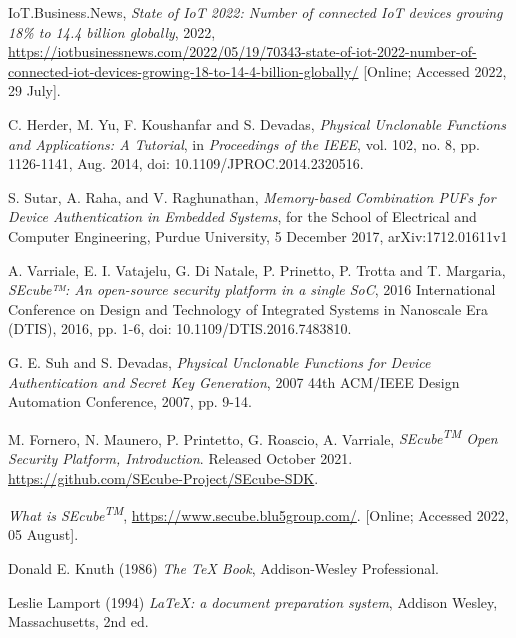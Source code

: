 \begin{thebibliography}{9}

IoT.Business.News, \emph{State of IoT 2022: Number of connected IoT devices growing 18\% to 14.4 billion globally},  2022, \url{https://iotbusinessnews.com/2022/05/19/70343-state-of-iot-2022-number-of-connected-iot-devices-growing-18-to-14-4-billion-globally/} [Online; Accessed 2022, 29 July].

C. Herder, M. Yu, F. Koushanfar and S. Devadas, \emph{Physical Unclonable Functions and Applications: A Tutorial}, in \emph{Proceedings of the IEEE}, vol. 102, no. 8, pp. 1126-1141, Aug. 2014, doi: 10.1109/JPROC.2014.2320516.

S. Sutar, A. Raha, and V. Raghunathan, \emph{Memory-based Combination PUFs for Device Authentication in Embedded Systems}, for the School of Electrical and Computer Engineering, Purdue University, 5 December 2017, arXiv:1712.01611v1

A. Varriale, E. I. Vatajelu, G. Di Natale, P. Prinetto, P. Trotta and T. Margaria, \emph{SEcube™: An open-source security platform in a single SoC}, 2016 International Conference on Design and Technology of Integrated Systems in Nanoscale Era (DTIS), 2016, pp. 1-6, doi: 10.1109/DTIS.2016.7483810.

G. E. Suh and S. Devadas, \emph{Physical Unclonable Functions for Device Authentication and Secret Key Generation}, 2007 44th ACM/IEEE Design Automation Conference, 2007, pp. 9-14.

M. Fornero, N. Maunero, P. Printetto, G. Roascio, A. Varriale, \emph{SEcube\textsuperscript{TM} Open Security Platform, Introduction}. Released October 2021. \url{https://github.com/SEcube-Project/SEcube-SDK}. 

\emph{What is SEcube\textsuperscript{TM}},  \url{https://www.secube.blu5group.com/}. [Online; Accessed 2022, 05 August].


Donald E. Knuth (1986) \emph{The \TeX{} Book}, Addison-Wesley Professional.

Leslie Lamport (1994) \emph{\LaTeX: a document preparation system}, Addison
Wesley, Massachusetts, 2nd ed.


    
\end{thebibliography}